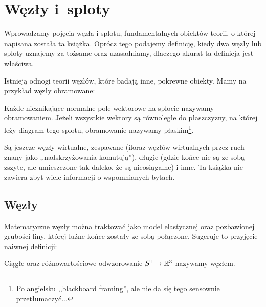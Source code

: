 
\section{Węzły i~sploty}

Wprowadzamy pojęcia węzła i splotu, fundamentalnych obiektów teorii, o której napisana została ta książka.
Oprócz tego podajemy definicję, kiedy dwa węzły lub sploty uznajemy za tożsame oraz uzasadniamy, dlaczego akurat ta definicja jest właściwa.

Istnieją odnogi teorii węzłów, które badają inne, pokrewne obiekty.
Mamy na przykład węzły obramowane:

\begin{definition}[obramowanie]
%
%
    Każde nieznikające normalne pole wektorowe na splocie nazywamy obramowaniem.
    Jeżeli wszystkie wektory są równoległe do płaszczyzny, na której leży diagram tego splotu, obramowanie nazywamy płaskim\footnote{Po angielsku ,,blackboard framing'', ale nie da się tego sensownie przetłumaczyć...}.
\end{definition}


Są jeszcze węzły wirtualne, zespawane (iloraz węzłów wirtualnych przez ruch znany jako ,,nadskrzyżowania komutują''), długie (gdzie końce nie są ze sobą zszyte, ale umieszczone tak daleko, że są nieosiągalne) i inne.
%
%
%
Ta książka nie zawiera zbyt wiele informacji o wspomnianych bytach.

\subsection{Węzły}
Matematyczne węzły można traktować jako model elastycznej oraz pozbawionej grubości liny, której luźne końce zostały ze sobą połączone.
Sugeruje to przyjęcie naiwnej definicji:

\begin{definition}[węzeł]
    Ciągłe oraz różnowartościowe odwzorowanie $S^1 \to \mathbb R^3$ nazywamy węzłem.
\end{definition}

